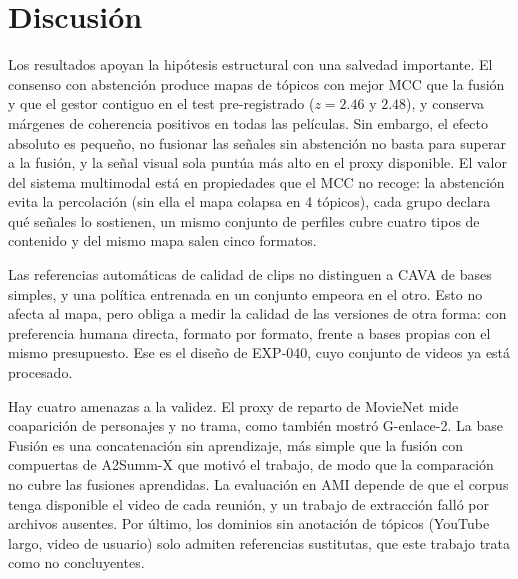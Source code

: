 \section{Discusión}

Los resultados apoyan la hipótesis estructural con una salvedad importante. El consenso con
abstención produce mapas de tópicos con mejor MCC que la fusión y que el gestor contiguo en
el test pre-registrado ($z = 2.46$ y $2.48$), y conserva márgenes de coherencia positivos en
todas las películas. Sin embargo, el efecto absoluto es pequeño, no fusionar las señales sin
abstención no basta para superar a la fusión, y la señal visual sola puntúa más alto en el
proxy disponible. El valor del sistema multimodal está en propiedades que el MCC no recoge:
la abstención evita la percolación (sin ella el mapa colapsa en 4 tópicos), cada grupo
declara qué señales lo sostienen, un mismo conjunto de perfiles cubre cuatro tipos de
contenido y del mismo mapa salen cinco formatos.

Las referencias automáticas de calidad de clips no distinguen a CAVA de bases simples, y una
política entrenada en un conjunto empeora en el otro. Esto no afecta al mapa, pero obliga a
medir la calidad de las versiones de otra forma: con preferencia humana directa, formato por
formato, frente a bases propias con el mismo presupuesto. Ese es el diseño de EXP-040, cuyo
conjunto de videos ya está procesado.

Hay cuatro amenazas a la validez. El proxy de reparto de MovieNet mide coaparición de
personajes y no trama, como también mostró G-enlace-2. La base Fusión es una
concatenación sin aprendizaje, más simple que la fusión con compuertas de A2Summ-X que motivó
el trabajo, de modo que la comparación no cubre las fusiones aprendidas. La evaluación en AMI
depende de que el corpus tenga disponible el video de cada reunión, y un trabajo de
extracción falló por archivos ausentes. Por último, los dominios sin anotación de tópicos
(YouTube largo, video de usuario) solo admiten referencias sustitutas, que este trabajo trata
como no concluyentes.
